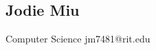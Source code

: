 \documentclass{article}
\begin{document}
\subsection*{Jodie Miu}
   Computer Science
   jm7481@rit.edu 
   
   



 

\end{document}
